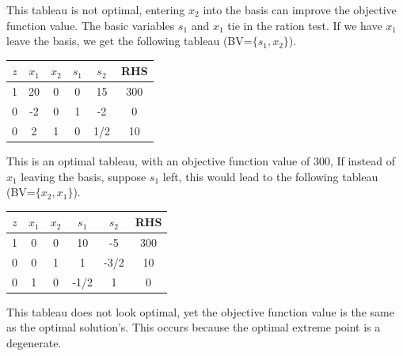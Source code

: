 This tableau is not optimal, entering $x_2$ into the basis can improve the objective function value. The basic variables $s_1$ and $x_1$ tie in the ration test.  If we have $x_1$ leave the basis, we get the following tableau (BV=$\{s_1, x_2\}$).
\begin{center} \begin{tabular} {|c|c|c|c|c||c|}
\hline
$z$ & $x_1$ & $x_2$ & $s_1$ & $s_2$ & RHS \\
\hline
  1 &    20 &     0 &     0 &    15 & 300 \\
  0 &    -2 &     0 &     1 &    -2 &  0 \\
  0 &     2 &     1 &     0 &   1/2 &  10 \\ \hline
\end{tabular} \end{center}
This is an optimal tableau, with an objective function value of 300,  If instead of $x_1$ leaving the basis, suppose $s_1$ left, this would lead to the following tableau (BV=$\{x_2, x_1\}$).
\begin{center} \begin{tabular} {|c|c|c|c|c||c|} \hline
$z$ & $x_1$ & $x_2$ & $s_1$ & $s_2$ & RHS \\
\hline
  1 &     0 &     0 &    10 &    -5 & 300 \\
  0 &     0 &     1 &     1 &  -3/2 &  10 \\
  0 &     1 &     0 &  -1/2 &     1 &   0 \\ \hline
\end{tabular} \end{center}
This tableau does not look optimal, yet the objective function value is the same as the optimal solution's. This occurs because the optimal extreme point is a degenerate.%


